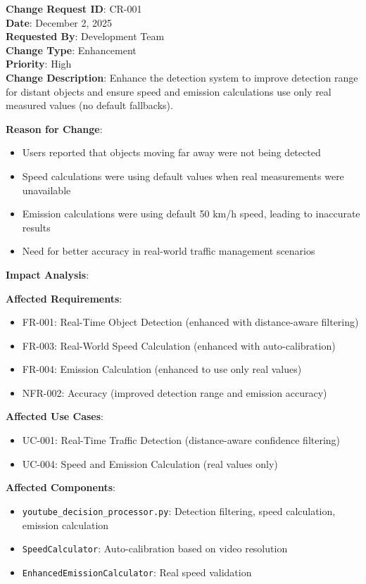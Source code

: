 \documentclass[12pt,a4paper]{article}
\begin{document}
\textbf{Change Request ID}: CR-001 \\
\textbf{Date}: December 2, 2025 \\
\textbf{Requested By}: Development Team \\
\textbf{Change Type}: Enhancement \\
\textbf{Priority}: High \\

\textbf{Change Description}:
Enhance the detection system to improve detection range for distant objects and ensure speed and emission calculations use only real measured values (no default fallbacks).

\textbf{Reason for Change}:
\begin{itemize}
    \item Users reported that objects moving far away were not being detected
    \item Speed calculations were using default values when real measurements were unavailable
    \item Emission calculations were using default 50 km/h speed, leading to inaccurate results
    \item Need for better accuracy in real-world traffic management scenarios
\end{itemize}

\textbf{Impact Analysis}:

\textbf{Affected Requirements}:
\begin{itemize}
    \item FR-001: Real-Time Object Detection (enhanced with distance-aware filtering)
    \item FR-003: Real-World Speed Calculation (enhanced with auto-calibration)
    \item FR-004: Emission Calculation (enhanced to use only real values)
    \item NFR-002: Accuracy (improved detection range and emission accuracy)
\end{itemize}

\textbf{Affected Use Cases}:
\begin{itemize}
    \item UC-001: Real-Time Traffic Detection (distance-aware confidence filtering)
    \item UC-004: Speed and Emission Calculation (real values only)
\end{itemize}

\textbf{Affected Components}:
\begin{itemize}
    \item \texttt{youtube\_decision\_processor.py}: Detection filtering, speed calculation, emission calculation
    \item \texttt{SpeedCalculator}: Auto-calibration based on video resolution
    \item \texttt{EnhancedEmissionCalculator}: Real speed validation
\end{itemize}
\end{document}
